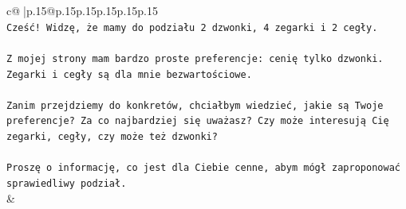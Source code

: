 \documentclass{article}
\begin{document}
{\begin{supertabular}{c@{$\;$}|p{.15\linewidth}@{}p{.15\linewidth}p{.15\linewidth}p{.15\linewidth}p{.15\linewidth}p{.15\linewidth}}
{{{\\ 
\texttt{Cześć! Widzę, że mamy do podziału 2 dzwonki, 4 zegarki i 2 cegły.} \\
\\ 
\texttt{Z mojej strony mam bardzo proste preferencje: cenię tylko dzwonki. Zegarki i cegły są dla mnie bezwartościowe.} \\
\\ 
\texttt{Zanim przejdziemy do konkretów, chciałbym wiedzieć, jakie są Twoje preferencje? Za co najbardziej się uważasz? Czy może interesują Cię zegarki, cegły, czy może też dzwonki?} \\
\\ 
\texttt{Proszę o informację, co jest dla Ciebie cenne, abym mógł zaproponować sprawiedliwy podział.} \\
            }
        }
    }
    & \\ \\


\end{supertabular}}
\end{document}
